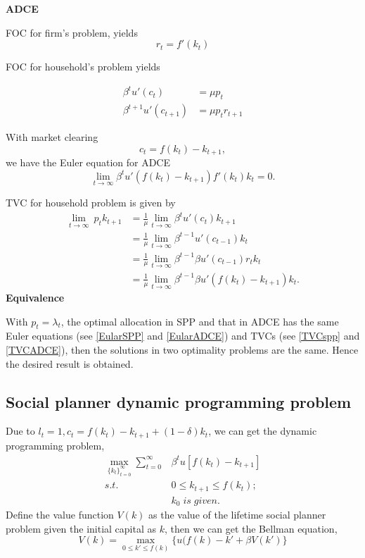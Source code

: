 \documentclass[12pt,notitlepage]{article}%
\numberwithin{equation}{section}
\begin{document}
\textbf{ADCE}

FOC for firm's problem, yields
\begin{equation*}
r_t=f'(k_t)
\end{equation*}

FOC for household's problem yields

\begin{equation*}
\begin{split}
\beta^tu'(c_t)&=\mu p_t\\
\beta^{t+1}u'(c_{t+1})&=\mu p_t r_{t+1}
\end{split}
\end{equation*}

With market clearing 
\begin{equation*}
c_t=f(k_t)-k_{t+1},
\end{equation*}
we have the Euler equation for ADCE
\begin{equation}\label{EularADCE}
\lim_{t\to \infty}\beta^t u'(f(k_t)-k_{t+1})f'(k_t)k_t=0.
\end{equation}

TVC for household problem is given by 
\begin{equation}\label{TVCADCE}
\begin{split}
\lim_{t\to \infty}\ p_tk_{t+1}&=\frac{1}{\mu}\lim_{t\to \infty}\beta^tu'(c_t)k_{t+1}\\
&=\frac{1}{\mu}\lim_{t\to \infty}\beta^{t-1}u'(c_{t-1})k_{t}\\
&=\frac{1}{\mu}\lim_{t\to \infty}\beta^{t-1}\beta u'(c_{t-1})r_tk_{t}\\
&=\frac{1}{\mu}\lim_{t\to \infty}\beta^{t-1}\beta u'(f(k_t)-k_{t+1})k_{t}.
\end{split}
\end{equation}
\textbf{Equivalence}

With $p_t=\lambda_t$, the optimal allocation in  SPP and that in ADCE has the same Euler equations (see  \ref{EularSPP} and \ref{EularADCE}) and TVCs (see \ref{TVCspp} and \ref{TVCADCE}), then the solutions in two optimality problems are the same. Hence the desired result is obtained. 

\subsection{Social planner dynamic programming problem}
Due to $l_t=1, c_t=f(k_t)-k_{t+1}+(1-\delta)k_t$, we can get the dynamic programming problem,
\begin{equation*}
\begin{split}
\max_{\{k_t\}_{t=0}^{\infty}}\sum_{t=0}^{\infty}&\beta^tu[f(k_t)-k_{t+1}]\\
s.t.\;\;&0\leq k_{t+1}\leq f(k_t);\\
&k_0 \; is\; given.
\end{split}
\end{equation*}
Define the value function $V(k)$ as the value of the lifetime social planner problem given the initial capital as $k$, then we can get the Bellman equation,
\begin{equation*}
V(k)=\max_{0\leq k'\leq f(k)} \{u(f(k)-k'+\beta V(k')\}
\end{equation*}
\end{document}
